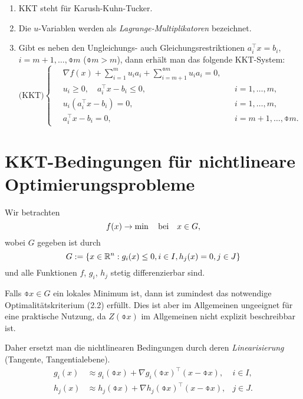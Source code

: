 \begin{rmrk*}
  \begin{enumerate}[(1)]
  \item KKT steht für Karush-Kuhn-Tucker.
  \item Die $u$-Variablen werden als \emph{Lagrange-Multiplikatoren} bezeichnet.
  \item Gibt es neben den Ungleichungs- auch Gleichungsrestriktionen $a_i^\top x =
    b_i$, $i = m+1, \ldots, \obar{m}$ ($\obar{m} > m$), dann erhält man das
    folgende KKT-System:
    \begin{equation} \label{eq:kkt-bed} %
      \text{(KKT)} \left\{ \quad \begin{aligned}
          \nabla f(x) + \sum_{i =1}^m u_i a_i + \sum_{i=m+1}^{\obar{m}} u_i a_i =
          0, & \\
          u_i \ge 0, \quad a_i^\top x - b_i \le 0, & &i = 1, \ldots, m, \\
          u_i(a_i^\top x - b_i) = 0, & &i = 1, \ldots, m, \\
          a_i^\top x - b_i = 0, & &i = m + 1, \ldots, \obar{m}.
        \end{aligned} \right.
    \end{equation}
  \end{enumerate}
\end{rmrk*}

\section{KKT-Bedingungen für nichtlineare Optimierungsprobleme}
Wir betrachten
\begin{equation} %
  f(x) \to \min \subjto x \in G,
\end{equation}
wobei $G$ gegeben ist durch
\[ G := \{ x \in \mathbb{R}^n : g_i(x) \le 0, i \in I, h_j(x) = 0, j \in J \} \]
und alle Funktionen $f$, $g_i$, $h_j$  stetig differenzierbar sind.

Falls $\obar{x} \in G$ ein lokales Minimum ist, dann ist zumindest das
notwendige Optimalitätskriterium (2.2) erfüllt. Dies ist aber im Allgemeinen
ungeeignet für eine praktische Nutzung, da $Z(\obar{x})$ im Allgemeinen nicht
explizit beschreibbar ist.

Daher ersetzt man die nichtlinearen Bedingungen durch deren
\emph{Linearisierung} (Tangente, Tangentialebene).
\[ \begin{aligned}
    g_i(x) &\approx g_i(\obar{x}) + \nabla g_i(\obar{x})^\top (x-\obar{x}),
    & i \in I, \\
    h_j(x) &\approx h_j(\obar{x}) + \nabla h_j(\obar{x})^\top (x-\obar{x}),
    & j \in J.
  \end{aligned} \]


